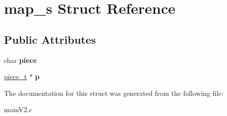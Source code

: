 \hypertarget{structmap__s}{}\section{map\+\_\+s Struct Reference}
\label{structmap__s}
\subsection*{Public Attributes}
\begin{DoxyCompactItemize}
\item 
\mbox{\label{structmap__s_a8a5e90ce58409c77e159f5272d1d567f}} 
char {\bfseries piece}
\item 
\mbox{\label{structmap__s_a7d1ad525bc23955921a99de4900e33e2}} 
\mbox{\hyperlink{structpiece__s}{piece\+\_\+t}} $\ast$ {\bfseries p}
\end{DoxyCompactItemize}


The documentation for this struct was generated from the following file\+:\begin{DoxyCompactItemize}
\item 
main\+V2.\+c\end{DoxyCompactItemize}
